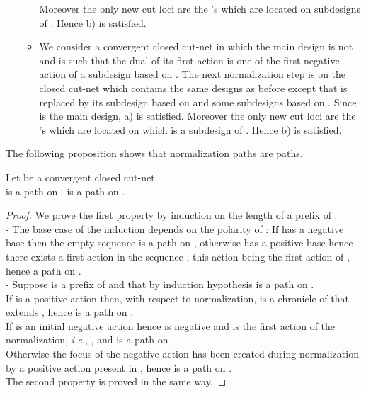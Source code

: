 \documentclass{LMCS}
\def\ie{{\em i.e.}}
\begin{document}
\begin{enumerate}
\begin{itemize}
\begin{itemize}
\end{itemize}
Moreover the only new cut loci are the 's which are located on subdesigns of . Hence b) is satisfied.
\item We consider a convergent closed cut-net in which the main design  is not  and is such that the dual of its first action  is one of the first negative action of a subdesign  based on .  The next normalization step is on the closed cut-net which contains the same designs as before except that  is replaced by its subdesign  based on  and some subdesigns  based on . Since  is the main design, a) is satisfied. Moreover the only new cut loci are the 's which are located on  which is a subdesign of . Hence b) is satisfied.
\end{itemize}
\end{enumerate}

The following proposition shows that normalization paths are paths.
 


\begin{prop}\label{prop:NormPath}
 Let  be a convergent closed cut-net.\\
 is a path on .
 is a path on .
\end{prop}
\begin{proof}
We prove the first property by induction on the length of a prefix of .\\
- The base case of the induction depends on the polarity of : If  has a negative base then the empty sequence is a path on , otherwise  has a positive base hence there exists a first action in the sequence , this action being the first action of , hence a path on .\\
- Suppose  is a prefix of  and that by induction hypothesis  is a path on .\\
If  is a positive action then, with respect to normalization,  is a chronicle of  that extends , hence  is a path on .\\
If  is an initial negative action hence  is negative and  is the first action of the normalization, \ie, , and  is a path on .\\
Otherwise the focus of the negative action  has been created during normalization by a positive action present in , hence  is a path on .\\
The second property is proved in the same way.
\end{proof}
\end{document}
